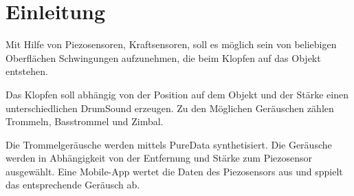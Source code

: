 \section{Einleitung}
Mit Hilfe von Piezosensoren, Kraftsensoren, soll es möglich sein von beliebigen Oberflächen Schwingungen aufzunehmen, die beim Klopfen auf das Objekt entstehen.

Das Klopfen soll abhängig von der Position auf dem Objekt und der Stärke einen unterschiedlichen DrumSound erzeugen. 
Zu den Möglichen Geräuschen zählen Trommeln, Basstrommel und Zimbal.

Die Trommelgeräusche werden mittels PureData synthetisiert. 
Die Geräusche werden in Abhängigkeit von der Entfernung und Stärke zum Piezosensor ausgewählt.
Eine Mobile-App wertet die Daten des Piezosensors aus und sppielt das entsprechende Geräusch ab.

